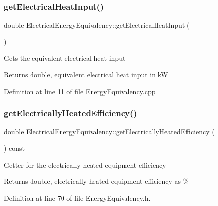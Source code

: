 \subsubsection{\texorpdfstring{get\+Electrical\+Heat\+Input()}{getElectricalHeatInput()}}
{\footnotesize\ttfamily double Electrical\+Energy\+Equivalency\+::get\+Electrical\+Heat\+Input (\begin{DoxyParamCaption}{ }\end{DoxyParamCaption})}

Gets the equivalent electrical heat input \begin{DoxyReturn}{Returns}
double, equivalent electrical heat input in kW 
\end{DoxyReturn}


Definition at line 11 of file Energy\+Equivalency.\+cpp.

\mbox{\label{class_electrical_energy_equivalency_a83438510f522aa045f4b1007fca1d2fd}} 
\subsubsection{\texorpdfstring{get\+Electrically\+Heated\+Efficiency()}{getElectricallyHeatedEfficiency()}}
{\footnotesize\ttfamily double Electrical\+Energy\+Equivalency\+::get\+Electrically\+Heated\+Efficiency (\begin{DoxyParamCaption}{ }\end{DoxyParamCaption}) const\hspace{0.3cm}{\ttfamily [inline]}}

Getter for the electrically heated equipment efficiency

\begin{DoxyReturn}{Returns}
double, electrically heated equipment efficiency as \% 
\end{DoxyReturn}


Definition at line 70 of file Energy\+Equivalency.\+h.

\mbox{\label{class_electrical_energy_equivalency_adc8def25354f6ba8c3479040507b0ea6}} 
